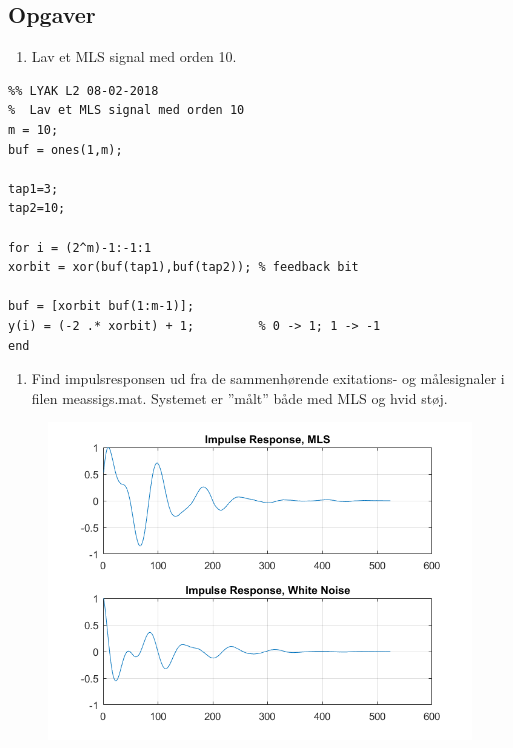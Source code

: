 \newpage\subsection{Opgaver}

\begin{enumerate}
	\item Lav et MLS signal med orden 10.
\end{enumerate}


\begin{lstlisting}
%% LYAK L2 08-02-2018
%  Lav et MLS signal med orden 10
m = 10;
buf = ones(1,m);  

tap1=3;
tap2=10;

for i = (2^m)-1:-1:1
xorbit = xor(buf(tap1),buf(tap2)); % feedback bit

buf = [xorbit buf(1:m-1)];
y(i) = (-2 .* xorbit) + 1;         % 0 -> 1; 1 -> -1
end
\end{lstlisting}

\begin{enumerate}[resume]
	\item Find impulsresponsen ud fra de sammenhørende exitations- og målesignaler i filen meassigs.mat. Systemet er ”målt” både med MLS og hvid støj. 
\end{enumerate}

\begin{figure} [H]
	\centering
	\includegraphics[width=\linewidth]{graphics/46.png}
	\label{fig:46}
\end{figure}


